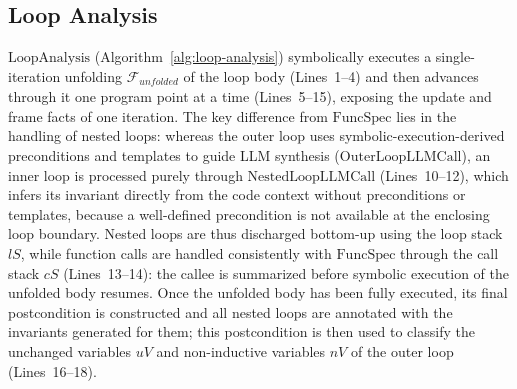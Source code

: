 \subsection{Loop Analysis}
$\mathrm{LoopAnalysis}$ (Algorithm~\ref{alg:loop-analysis}) symbolically executes a single-iteration unfolding $\mathcal{F}_{\textit{unfolded}}$ of the loop body (Lines~1--4) and then advances through it one program point at a time (Lines~5--15), exposing the update and frame facts of one iteration. The key difference from $\mathrm{FuncSpec}$ lies in the handling of nested loops: whereas the outer loop uses symbolic-execution-derived preconditions and templates to guide LLM synthesis ($\mathrm{OuterLoopLLMCall}$), an inner loop is processed purely through $\mathrm{NestedLoopLLMCall}$ (Lines~10--12), which infers its invariant directly from the code context without preconditions or templates, because a well-defined precondition is not available at the enclosing loop boundary. Nested loops are thus discharged bottom-up using the loop stack $\textit{lS}$, while function calls are handled consistently with $\mathrm{FuncSpec}$ through the call stack $\textit{cS}$ (Lines~13--14): the callee is summarized before symbolic execution of the unfolded body resumes. Once the unfolded body has been fully executed, its final postcondition is constructed and all nested loops are annotated with the invariants generated for them; this postcondition is then used to classify the unchanged variables $\textit{uV}$ and non-inductive variables $\textit{nV}$ of the outer loop (Lines~16--18).
